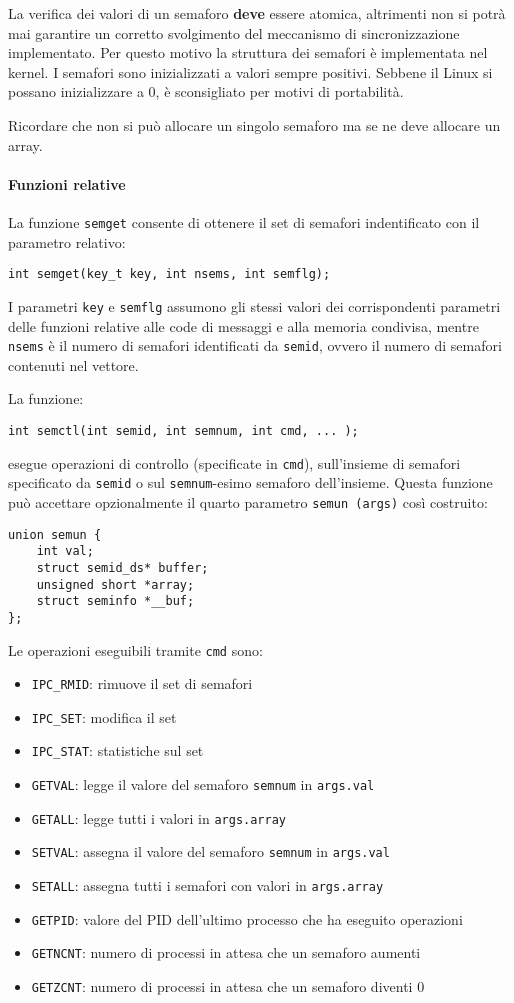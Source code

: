 \documentclass[a4paper, 10pt]{article}
\begin{document}
La verifica dei valori di un semaforo \textbf{deve} essere atomica, altrimenti non si potrà mai garantire un corretto svolgimento del meccanismo di sincronizzazione implementato. Per questo motivo la struttura dei semafori è implementata nel kernel. I semafori sono inizializzati a valori sempre positivi. Sebbene il Linux si possano inizializzare a 0, è sconsigliato per motivi di portabilità.

Ricordare che non si può allocare un singolo semaforo ma se ne deve allocare un array. 

\paragraph{Funzioni relative}
La funzione \verb|semget| consente di ottenere il set di semafori indentificato con il parametro relativo:
\begin{verbatim}
int semget(key_t key, int nsems, int semflg);
\end{verbatim}

I parametri \verb|key| e \verb|semflg| assumono gli stessi valori dei corrispondenti parametri delle funzioni relative alle code di messaggi e alla memoria condivisa, mentre \verb|nsems| è il numero di semafori identificati da \verb|semid|, ovvero il numero di semafori contenuti nel vettore.

La funzione:
\begin{verbatim}
int semctl(int semid, int semnum, int cmd, ... );
\end{verbatim}
esegue operazioni di controllo (specificate in \verb|cmd|), sull'insieme di semafori specificato da \verb|semid| o sul \verb|semnum|-esimo semaforo dell'insieme.
Questa funzione può accettare opzionalmente il quarto parametro \verb|semun (args)| così costruito:
\begin{verbatim}
union semun {
    int val;
    struct semid_ds* buffer;
    unsigned short *array;
    struct seminfo *__buf;
};
\end{verbatim}

Le operazioni eseguibili tramite \verb|cmd| sono:
\begin{itemize}
\item \verb|IPC_RMID|: rimuove il set di semafori
\item \verb|IPC_SET|: modifica il set
\item \verb|IPC_STAT|: statistiche sul set
\item \verb|GETVAL|: legge il valore del semaforo \verb|semnum| in \verb|args.val|
\item \verb|GETALL|: legge tutti i valori in \verb|args.array|
\item \verb|SETVAL|: assegna il valore del semaforo \verb|semnum| in \verb|args.val|
\item \verb|SETALL|: assegna tutti i semafori con valori in \verb|args.array|
\item \verb|GETPID|: valore del PID dell'ultimo processo che ha eseguito operazioni
\item \verb|GETNCNT|: numero di processi in attesa che un semaforo aumenti
\item \verb|GETZCNT|: numero di processi in attesa che un semaforo diventi 0
\end{itemize}
\end{document}
